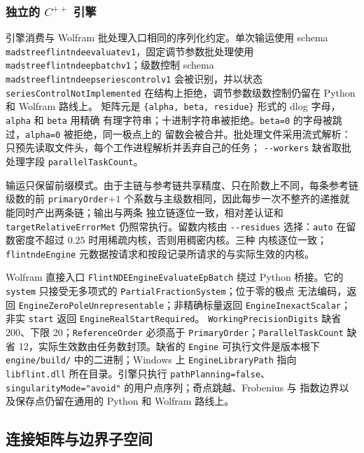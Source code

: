 \documentclass[11pt,a4paper]{ctexart}
\renewcommand{\_}{\origunderscore\allowbreak}
\begin{document}
\subsubsection{独立的 \texorpdfstring{$C^{++}$}{C++} 引擎}
\label{subsec:engine}

引擎消费与 Wolfram 批处理入口相同的序列化约定。单次输运使用 schema
\texttt{madstree\_flintnde\_evaluate\_v1}，固定调节参数批处理使用
\texttt{madstree\_flintnde\_ep\_batch\_v1}；级数控制 schema
\texttt{madstree\_flintnde\_ep\_series\_control\_v1} 会被识别，并以状态
\texttt{seriesControlNotImplemented} 在结构上拒绝，调节参数级数控制仍留在 Python 和 Wolfram 路线上。
矩阵元是 \texttt{\{alpha, beta, residue\}} 形式的 dlog 字母，\texttt{alpha} 和 \texttt{beta} 用精确
有理字符串；十进制字符串被拒绝。\texttt{beta=0} 的字母被跳过，\texttt{alpha=0} 被拒绝，同一极点上的
留数会被合并。批处理文件采用流式解析：只预先读取文件头，每个工作进程解析并丢弃自己的任务；
\texttt{-{}-workers} 缺省取批处理字段 \texttt{parallelTaskCount}。

输运只保留前缀模式。由于主链与参考链共享精度、只在阶数上不同，每条参考链级数的前
\texttt{primaryOrder}$+1$ 个系数与主级数相同，因此每步一次不整齐的递推就能同时产出两条链；输出与两条
独立链逐位一致，相对差认证和 \texttt{targetRelativeErrorMet} 仍照常执行。留数内核由
\texttt{-{}-residues} 选择：\texttt{auto} 在留数密度不超过 $0.25$ 时用稀疏内核，否则用稠密内核。三种
内核逐位一致；\texttt{flintndeEngine} 元数据按请求和按段记录所请求的与实际生效的内核。

Wolfram 直接入口
\texttt{FlintNDE}\allowbreak\texttt{Engine}\allowbreak\texttt{Evaluate}\allowbreak\texttt{EpBatch}
绕过 Python 桥接。它的 \texttt{system} 只接受无多项式的 \texttt{PartialFractionSystem}；位于零的极点
无法编码，返回 \texttt{EngineZeroPoleUnrepresentable}；非精确标量返回
\texttt{EngineInexactScalar}；非实 \texttt{start} 返回 \texttt{EngineRealStartRequired}。
\texttt{WorkingPrecisionDigits} 缺省 200、下限 20；\texttt{ReferenceOrder} 必须高于
\texttt{PrimaryOrder}；\texttt{ParallelTaskCount} 缺省 12，实际生效数由任务数封顶。缺省的
\texttt{Engine} 可执行文件是版本根下 \texttt{engine/build/} 中的二进制；Windows 上
\texttt{EngineLibraryPath} 指向 \texttt{libflint.dll} 所在目录。引擎只执行
\texttt{pathPlanning=false}、\texttt{singularityMode="avoid"} 的用户点序列；奇点跳越、Frobenius 与
指数边界以及保存点仍留在通用的 Python 和 Wolfram 路线上。

\subsection{连接矩阵与边界子空间}
\end{document}
